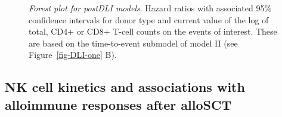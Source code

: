 \documentclass[
  letterpaper,
  paper=240mm:170mm,
  twoside=true,
  open=right,
  fontsize=10pt,
  pagesize=false,
  BCOR=15mm,
  DIV=14,
  headinclude=true,
  footinclude=false,
  headsepline=on]{scrbook}
\begin{document}
\begin{figure}


\caption{\label{fig-DLI-six}\emph{Forest plot for postDLI models}.
Hazard ratios with associated 95\% confidence intervals for donor type
and current value of the log of total, CD4+ or CD8+ T-cell counts on the
events of interest. These are based on the time-to-event submodel of
model II (see Figure~\ref{fig-DLI-one} B).}

\end{figure}%

\subsection{NK cell kinetics and associations with alloimmune responses
after
alloSCT}\label{nk-cell-kinetics-and-associations-with-alloimmune-responses-after-allosct}
\end{document}
